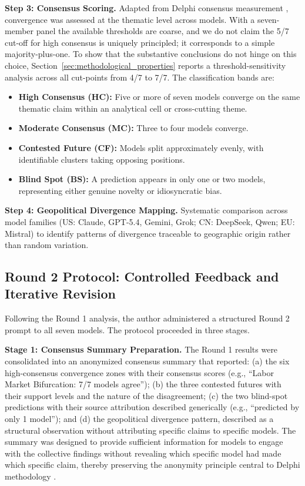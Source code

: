 \documentclass[preprint,review,12pt]{elsarticle}
\begin{document}
\textbf{Step 3: Consensus Scoring.} Adapted from Delphi consensus measurement \citep{vondergracht2012delphi}, convergence was assessed at the thematic level across models. With a seven-member panel the available thresholds are coarse, and we do not claim the 5/7 cut-off for high consensus is uniquely principled; it corresponds to a simple majority-plus-one. To show that the substantive conclusions do not hinge on this choice, Section~\ref{sec:methodological_properties} reports a threshold-sensitivity analysis across all cut-points from 4/7 to 7/7. The classification bands are:

\begin{itemize}
 \item \textbf{High Consensus (HC):} Five or more of seven models converge on the same thematic claim within an analytical cell or cross-cutting theme.
 \item \textbf{Moderate Consensus (MC):} Three to four models converge.
 \item \textbf{Contested Future (CF):} Models split approximately evenly, with identifiable clusters taking opposing positions.
 \item \textbf{Blind Spot (BS):} A prediction appears in only one or two models, representing either genuine novelty or idiosyncratic bias.

\end{itemize}
\textbf{Step 4: Geopolitical Divergence Mapping.} Systematic comparison across model families (US: Claude, GPT-5.4, Gemini, Grok; CN: DeepSeek, Qwen; EU: Mistral) to identify patterns of divergence traceable to geographic origin rather than random variation.


\subsection{Round 2 Protocol: Controlled Feedback and Iterative Revision}
\label{sec:round2_protocol}

Following the Round 1 analysis, the author administered a structured Round 2 prompt to all seven models. The protocol proceeded in three stages.

\textbf{Stage 1: Consensus Summary Preparation.} The Round 1 results were consolidated into an anonymized consensus summary that reported: (a) the six high-consensus convergence zones with their consensus scores (e.g., ``Labor Market Bifurcation: 7/7 models agree''); (b) the three contested futures with their support levels and the nature of the disagreement; (c) the two blind-spot predictions with their source attribution described generically (e.g., ``predicted by only 1 model''); and (d) the geopolitical divergence pattern, described as a structural observation without attributing specific claims to specific models. The summary was designed to provide sufficient information for models to engage with the collective findings without revealing which specific model had made which specific claim, thereby preserving the anonymity principle central to Delphi methodology \citep{vondergracht2012delphi}.
\end{document}
